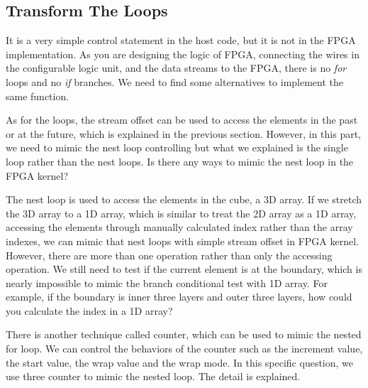 \subsection{Transform The Loops} %
\label{ssub:Transform the lo}
It is a very simple control statement in the host code, but it is not in
the FPGA implementation. As you are designing the logic of FPGA, connecting
the wires in the configurable logic unit, and the data streams to the FPGA,
there is no \emph{for} loops and no \emph{if} branches. We need to find
some alternatives to implement the same function.

As for the loops, the stream offset can be used to access the elements
in the past or at the future, which is explained in  the previous
section. However, in this part, we need to mimic the nest loop
controlling but what we explained is the single loop rather than the
nest loops. Is there any ways to mimic the nest loop in the FPGA kernel?

The nest loop is used to access the elements in the cube, a 3D array. If we
stretch the 3D array to a 1D array, which is similar to treat the 2D array
as a 1D array, accessing the elements through manually calculated index
rather than the array indexes, we can mimic that nest loops with simple
stream offset in FPGA kernel. However, there are more than one operation
rather than only the accessing operation. We still need to test if the
current element is at the boundary, which is nearly impossible to mimic the
branch conditional test with 1D array. For example, if the boundary is
inner three layers and outer three layers, how could you calculate the
index in a 1D array?

There is another technique called counter, which can be used to mimic the
nested for loop. We can control the behaviors of the counter such as the
increment value, the start value, the wrap value and the wrap mode. In this
specific question, we use three counter to mimic the nested loop. The
detail is explained.

